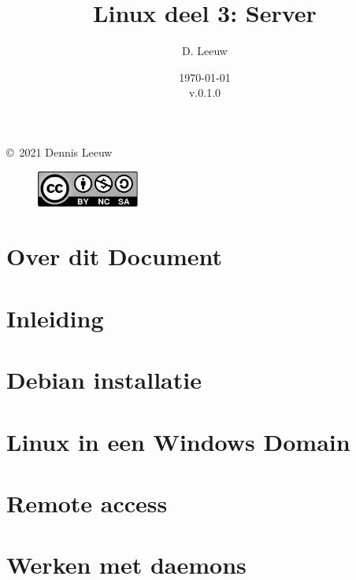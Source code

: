 \documentclass[a4paper,12pt,twoside,openright,titlepage]{book}
\author{D. Leeuw}
\title{Linux deel 3: Server}
\date{\today\\v.0.1.0}
\begin{document}

\maketitle

\copyright\ 2021 Dennis Leeuw\\

\begin{figure}
\includegraphics[width=0.3\textwidth]{CC-BY-SA-NC.png}
\end{figure}

\bigskip




\frontmatter
\chapter{Over dit Document}



\tableofcontents

\mainmatter
\chapter{Inleiding}


\chapter{Debian installatie}


\chapter{Linux in een Windows Domain}

\chapter{Remote access}

\chapter{Werken met daemons}
\end{document}
